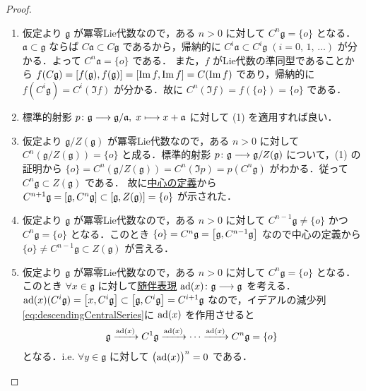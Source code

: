 \documentclass[rep_main]{subfiles}
\begin{document}
\begin{proof}
    \begin{enumerate}
        \item 仮定より $\mathfrak{g}$ が冪零Lie代数なので，ある $n > 0$ に対して $C^n \mathfrak{g} = \{o\}$ となる．$\mathfrak{a} \subset \mathfrak{g}$ ならば $C \mathfrak{a} \subset C \mathfrak{g}$ であるから，帰納的に $C^i \mathfrak{a} \subset C^i \mathfrak{g}\; (i = 0,\, 1,\, \dots)$ が分かる．よって $C^n \mathfrak{a} = \{o\}$ である．
        また，$f$ がLie代数の準同型であることから $f(C \mathfrak{g}) = \comm{f(\mathfrak{g})}{f(\mathfrak{g})} = \comm{\Im f}{\Im f} = C(\Im f)$ であり，帰納的に $f(C^i \mathfrak{g}) = C^i(\Im f)$ が分かる．故に $C^n (\Im f) = f(\{o\}) = \{o\}$ である．
        \item 標準的射影 $p \colon \mathfrak{g} \longrightarrow \mathfrak{g}/\mathfrak{a},\; x \longmapsto x + \mathfrak{a}$ に対して (1) を適用すれば良い．
        \item 仮定より $\mathfrak{g} / Z(\mathfrak{g})$ が冪零Lie代数なので，ある $n > 0$ に対して $C^n (\mathfrak{g}/Z(\mathfrak{g})) = \{o\}$ と成る．標準的射影 $p \colon \mathfrak{g} \longrightarrow \mathfrak{g}/Z(\mathfrak{g})$ について，(1) の証明から $\{o\} = C^n (\mathfrak{g}/Z(\mathfrak{g})) = C^n (\Im p) = p (C^n \mathfrak{g})$ がわかる．従って $C^n \mathfrak{g} \subset Z(\mathfrak{g})$ である．
        故に\hyperref[def:center-LieAlg]{中心の定義}から $C^{n+1} \mathfrak{g} = \comm{\mathfrak{g}}{C^n \mathfrak{g}} \subset \comm{\mathfrak{g}}{Z(\mathfrak{g})} = \{o\}$ が示された．
        \item 仮定より $\mathfrak{g}$ が冪零Lie代数なので，ある $n > 0$ に対して $C^{n-1} \mathfrak{g} \neq \{o\}$ かつ $C^n \mathfrak{g} = \{o\}$ となる．このとき $\{o\} = C^{n} \mathfrak{g} = \comm{\mathfrak{g}}{C^{n-1}\mathfrak{g}}$ なので中心の定義から $\{o\} \neq C^{n-1}\mathfrak{g} \subset Z(\mathfrak{g})$ が言える．
        \item 仮定より $\mathfrak{g}$ が冪零Lie代数なので，ある $n > 0$ に対して $C^n \mathfrak{g} = \{o\}$ となる．このとき $\forall x \in \mathfrak{g}$ に対して\hyperref[def:adj-LieAlg]{随伴表現} $\operatorname{ad} (x) \colon \mathfrak{g} \longrightarrow \mathfrak{g}$ を考える．$\ad(x)(C^i \mathfrak{g}) = \comm{x}{C^i\mathfrak{g}} \subset \comm{\mathfrak{g}}{C^i\mathfrak{g}} = C^{i+1} \mathfrak{g}$ なので，イデアルの減少列\eqref{eq:descendingCentralSeries}に $\operatorname{ad}(x)$ を作用させると
        \begin{align}
            \mathfrak{g} \xrightarrow{\operatorname{ad}(x)} C^1 \mathfrak{g} \xrightarrow{\operatorname{ad}(x)} \cdots \xrightarrow{\operatorname{ad}(x)} C^n \mathfrak{g} = \{o\}
        \end{align}
        となる．i.e. $\forall y \in \mathfrak{g}$ に対して $\bigl(\operatorname{ad}(x)\bigr)^n = 0$ である．
    \end{enumerate}
\end{proof}
\end{document}
